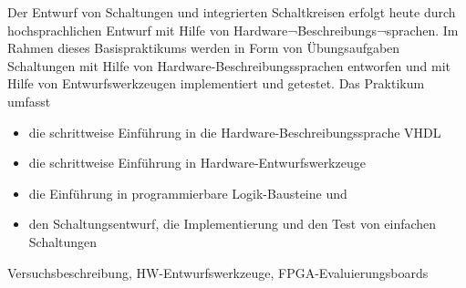 \begin{course}
\begin{content}
Der Entwurf von Schaltungen und integrierten Schaltkreisen erfolgt heute durch hochsprachlichen Entwurf mit Hilfe von Hardware¬Beschreibungs¬sprachen. \newline
Im Rahmen dieses Basispraktikums werden in Form von Übungsaufgaben Schaltungen mit Hilfe von Hardware-Beschreibungssprachen entworfen und mit Hilfe von Entwurfswerkzeugen implementiert und getestet. \newline
\newline
Das Praktikum umfasst

 \begin{itemize}\item die schrittweise Einführung in die Hardware-Beschreibungssprache VHDL  \item die schrittweise Einführung in Hardware-Entwurfswerkzeuge   \item die Einführung in programmierbare Logik-Bausteine und  \item den Schaltungsentwurf, die Implementierung und den Test von einfachen Schaltungen   \end{itemize}
\end{content}

\begin{media}Versuchsbeschreibung, HW-Entwurfswerkzeuge, FPGA-Evaluierungsboards

\end{media}





\end{course}